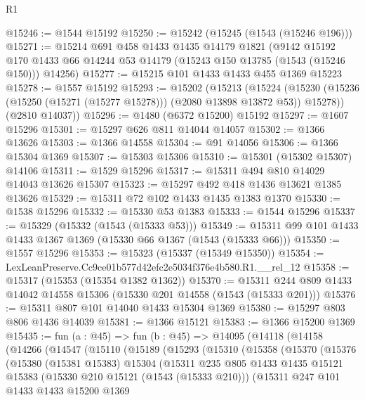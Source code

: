 \begin{lexlean}{R1}
\begin{coremodule}
@15246 := @1544 @15192
@15250 := @15242 (@15245 (@1543 (@15246 @196)))
@15271 := @15214
    @691
    @458
    @1433
    @1435
    @14179
    @1821
    (@9142
      @15192
      @170
      @1433
      @66
      @14244
      @53
      @14179
      (@15243 @150 @13785 (@1543 (@15246 @150)))
      @14256)
@15277 := @15215 @101 @1433 @1433 @455 @1369 @15223
@15278 := @1557 @15192
@15293 := @15202
    (@15213
      (@15224 (@15230 (@15236 (@15250 (@15271 (@15277 @15278))) (@2080 @13898 @13872 @53)) @15278))
      (@2810 @14037))
@15296 := @1480 (@6372 @15200) @15192
@15297 := @1607 @15296
@15301 := @15297 @626 @811 @14044 @14057
@15302 := @1366 @13626
@15303 := @1366 @14558
@15304 := @91 @14056
@15306 := @1366 @15304 @1369
@15307 := @15303 @15306
@15310 := @15301 (@15302 @15307) @14106
@15311 := @1529 @15296
@15317 := @15311 @494 @810 @14029 @14043 @13626 @15307
@15323 := @15297 @492 @418 @1436 @13621 @1385 @13626
@15329 := @15311 @72 @102 @1433 @1435 @1383 @1370
@15330 := @1538 @15296
@15332 := @15330 @53 @1383
@15333 := @1544 @15296
@15337 := @15329 (@15332 (@1543 (@15333 @53)))
@15349 := @15311 @99 @101 @1433 @1433 @1367 @1369 (@15330 @66 @1367 (@1543 (@15333 @66)))
@15350 := @1557 @15296
@15353 := @15323 (@15337 (@15349 @15350))
@15354 := LexLeanPreserve.Cc9ce01b577d42efc2e5034f376e4b580.R1.__rel_12
@15358 := @15317 (@15353 (@15354 @1382 @1362))
@15370 := @15311 @244 @809 @1433 @14042 @14558 @15306 (@15330 @201 @14558 (@1543 (@15333 @201)))
@15376 := @15311 @807 @101 @14040 @1433 @15304 @1369
@15380 := @15297 @803 @806 @1436 @14039
@15381 := @1366 @15121
@15383 := @1366 @15200 @1369
@15435 := fun (a : @45) =>
  fun (b : @45) =>
  @14095
    (@14118
      (@14158
        (@14266
          (@14547
            (@15110
              (@15189
                (@15293
                  (@15310
                    (@15358
                      (@15370
                        (@15376
                          (@15380
                            (@15381 @15383)
                            @15304
                            (@15311
                              @235
                              @805
                              @1433
                              @1435
                              @15121
                              @15383
                              (@15330 @210 @15121 (@1543 (@15333 @210)))
                              (@15311
                                @247
                                @101
                                @1433
                                @1433
                                @15200
                                @1369

\end{coremodule}
\end{lexlean}
